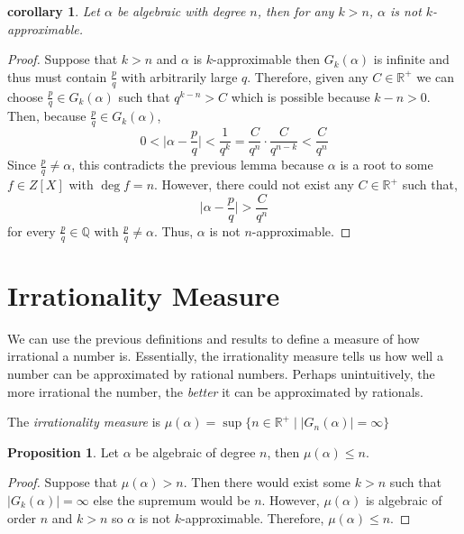 \documentclass{article}
\newcommand{\Q}{\mathbb{Q}}
\newcommand{\Rplus}{\mathbb{R}^+}
\newenvironment{definition}[1][Definition:]{\begin{trivlist}
\item[\hskip \labelsep {\bfseries #1}]}{\end{trivlist}}
\theoremstyle{theorem}
\newtheorem{corollary}[theorem]{corollary}
\theoremstyle{definition}
\theoremstyle{definition}
\newtheorem*{proposition}{Proposition}
\theoremstyle{remark}
\theoremstyle{definition}
\theoremstyle{remark}
\begin{document}
\begin{corollary}
Let $\alpha$ be algebraic with degree $n$, then for any $k > n$, $\alpha$ is not $k$-approximable. 
\end{corollary}

\begin{proof}
Suppose that $k > n$ and $\alpha$ is $k$-approximable then $G_k(\alpha)$ is infinite and thus must contain $\frac{p}{q}$ with arbitrarily large $q$. Therefore, given any $C \in \Rplus$ we can choose $\frac{p}{q} \in G_k(\alpha)$ such that $q^{k-n} > C$ which is possible because $k - n > 0$. Then, because $\frac{p}{q} \in G_k(\alpha)$,
\[ 0 < \Big| \alpha - \frac{p}{q} \Big| < \frac{1}{q^k} = \frac{C}{q^n} \cdot \frac{C}{q^{n-k}} < \frac{C}{q^n}\]
Since $\frac{p}{q} \neq \alpha$, this contradicts the previous lemma because $\alpha$ is a root to some $f \in Z[X]$ with $\deg{f} = n$. However, there could not exist any $C \in \Rplus$ such that, 
\[ \Big| \alpha - \frac{p}{q} \Big| > \frac{C}{q^n}\]
for every $\frac{p}{q} \in \Q$ with $\frac{p}{q} \neq \alpha$. Thus, $\alpha$ is not $n$-approximable. 
\end{proof}

\section{Irrationality Measure} 

We can use the previous definitions and results to define a measure of how irrational a number is. Essentially, the irrationality measure tells us how well a number can be approximated by rational numbers. Perhaps unintuitively, the more irrational the number, the \textit{better} it can be approximated by rationals.

\begin{definition}
The \textit{irrationality measure} is $\mu(\alpha) = \sup\{n \in \Rplus \mid |G_n(\alpha)| = \infty\}$   
\end{definition}

\begin{proposition}
Let $\alpha$ be algebraic of degree $n$, then $\mu(\alpha) \le n$. 
\end{proposition}

\begin{proof}
Suppose that $\mu(\alpha) > n$. Then there would exist some $k > n$ such that $|G_k(\alpha)| = \infty$ else the supremum would be $n$. However, $\mu(\alpha)$ is algebraic of order $n$ and $k > n$ so $\alpha$ is not $k$-approximable. Therefore, $\mu(\alpha) \le n$. 
\end{proof}
\end{document}
